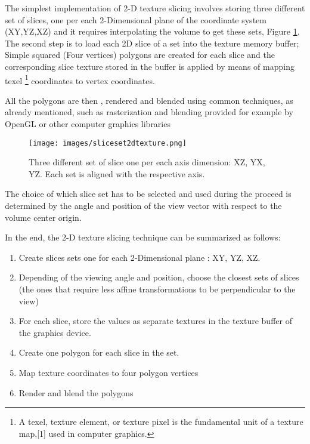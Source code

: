 \documentclass[12pt,a4paper]{extarticle}
\newcommand{\linespace}{\vspace{8pt}}
\begin{document}
The simplest implementation of 2-D texture slicing involves storing three different set of slices, one per each 2-Dimensional plane of the coordinate system (XY,YZ,XZ) and it requires interpolating the volume to get these sets, Figure \ref{fig:slicingset2dtexture}.
The second step is to load each 2D slice of a set into the texture memory buffer;  Simple squared (Four vertices) polygons are created for each slice and the corresponding slice texture stored in the buffer is applied by means of mapping texel \footnote{A texel, texture element, or texture pixel is the fundamental unit of a texture map,[1] used in computer graphics.}
 coordinates to vertex coordinates.

All the polygons are then , rendered and blended using common techniques, as already mentioned, such as rasterization and blending provided for example by OpenGL or other computer graphics libraries

\begin{figure}[hbtp]
\centering
\texttt{[image: images/sliceset2dtexture.png]}
\caption{Three different set of slice one per each axis dimension: XZ, YX, YZ. Each set is aligned with the respective axis.}
\label{fig:slicingset2dtexture}
\end{figure}


The choice of which slice set has to be selected and used during the proceed is determined by the angle and position of the view vector with respect to the volume center origin.

In the end, the 2-D texture slicing technique can be summarized as follows:
\begin{enumerate}
\item Create slices sets one for each 2-Dimensional plane : XY, YZ, XZ.
\item Depending of the viewing angle and position, choose the closest sets of slices (the ones that require less affine transformations to be perpendicular to the view)
\item For each slice, store the values as separate textures in the texture buffer of the graphics device.
\item Create one polygon for each slice in the set.
\item Map texture coordinates to four polygon vertices
\item Render and blend the polygons
\end{enumerate}
\linespace
\end{document}
